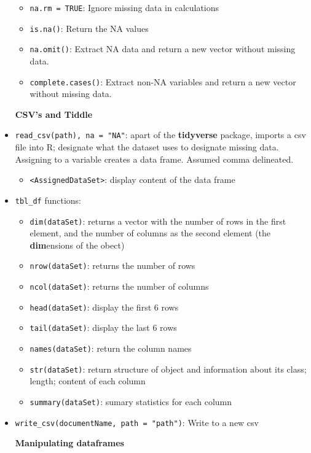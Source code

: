 \documentclass{article}
\begin{document}
\begin{itemize}
\begin{itemize}
        \item \verb|na.rm = TRUE|: Ignore missing data in calculations
        \item \verb|is.na()|: Return the NA values
        \item \verb|na.omit()|: Extract NA data and return a new vector without missing data.
        \item \verb|complete.cases()|: Extract non-NA variables and return a new vector without missing data.
    \end{itemize}
    \begin{center}
        \textbf{CSV's and Tiddle}
    \end{center}
    \item \verb|read_csv(path), na = "NA"|: apart of the \textbf{tidyverse} package, imports a csv file into R; designate what the dataset uses to designate missing data. Assigning to a variable creates a data frame. Assumed comma delineated.
    \begin{itemize}
        \item \verb|<AssignedDataSet>|: display content of the data frame
    \end{itemize}
    \item \verb|tbl_df| functions:
    \begin{itemize}
        \item \verb|dim(dataSet)|: returns a vector with the number of rows in the first element, and the number of columns as the second element (the \textbf{dim}ensions of the obect)
        \item \verb|nrow(dataSet)|: returns the number of rows
        \item \verb|ncol(dataSet)|: returns the number of columns
        \item \verb|head(dataSet)|: display the first 6 rows
        \item \verb|tail(dataSet)|: display the last 6 rows
        \item \verb|names(dataSet)|: return the column names
        \item \verb|str(dataSet)|: return structure of object and information about its class; length; content of each column
        \item \verb|summary(dataSet)|: sumary statistics for each column
    \end{itemize}
    \item \verb|write_csv(documentName, path = "path")|: Write to a new csv
    \begin{center}
        \textbf{Manipulating dataframes}

\end{center}
\end{itemize}
\end{document}
